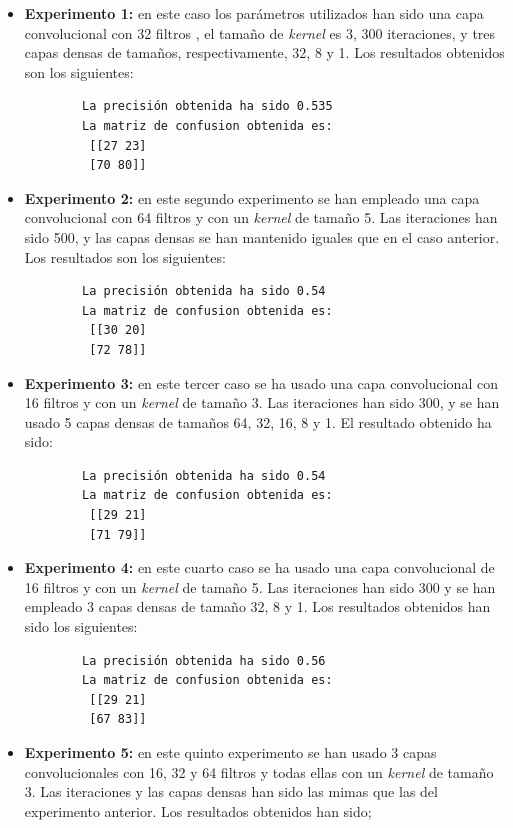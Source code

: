 \begin{itemize}
    \item \textbf{Experimento 1:} en este caso los parámetros utilizados han sido una capa convolucional con 32 filtros , el tamaño de \emph{kernel} es 3, 300 iteraciones, y tres capas densas de tamaños, respectivamente, 32, 8 y 1. Los resultados obtenidos son los siguientes:
    \begin{verbatim}
        La precisión obtenida ha sido 0.535
        La matriz de confusion obtenida es:
         [[27 23]
         [70 80]]
    \end{verbatim}
    \item \textbf{Experimento 2:} en este segundo experimento se han empleado una capa convolucional con 64 filtros y con un \emph{kernel} de tamaño 5. Las iteraciones han sido 500, y las capas densas se han mantenido iguales que en el caso anterior. Los resultados son los siguientes:
    \begin{verbatim}
        La precisión obtenida ha sido 0.54
        La matriz de confusion obtenida es:
         [[30 20]
         [72 78]]
    \end{verbatim}
    \item \textbf{Experimento 3:} en este tercer caso se ha usado una capa convolucional con 16 filtros y con un \emph{kernel} de tamaño 3. Las iteraciones han sido 300, y se han usado 5 capas densas de tamaños 64, 32, 16, 8 y 1. El resultado obtenido ha sido:
    \begin{verbatim}
        La precisión obtenida ha sido 0.54
        La matriz de confusion obtenida es:
         [[29 21]
         [71 79]]
    \end{verbatim}
    \item \textbf{Experimento 4:} en este cuarto caso se ha usado una capa convolucional de 16 filtros y con un \emph{kernel} de tamaño 5. Las iteraciones han sido 300 y se han empleado 3 capas densas de tamaño 32, 8 y 1.  Los resultados obtenidos han sido los siguientes:
    \begin{verbatim}
        La precisión obtenida ha sido 0.56
        La matriz de confusion obtenida es:
         [[29 21]
         [67 83]]
    \end{verbatim}
    \item \textbf{Experimento 5:} en este quinto experimento se han usado 3 capas convolucionales con  16, 32 y 64 filtros y todas ellas con un \emph{kernel} de tamaño 3. Las iteraciones y las capas densas han sido las mimas que las del experimento anterior. Los resultados obtenidos han sido;

\end{itemize}
